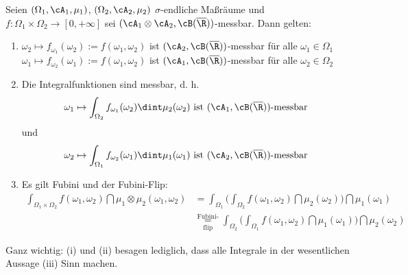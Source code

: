 \marginpar{\textcolor{red}{Vorlesung 19}}

\begin{satz}
	Seien $(\Omega_1, \cA_1, \mu_1)$, $(\Omega_2, \cA_2, \mu_2)$ $\sigma$-endliche Maßräume und $f\colon \Omega_1 \times \Omega_2 \to [0,+\infty]$ sei $(\cA_1 \otimes \cA_2, \cB(\overline{\R}))$-messbar. Dann gelten:
	\begin{enumerate}[label=(\roman*)]
		\item \label{FubOne} $\omega_2\mapsto f_{\omega_1}(\omega_2) := f(\omega_1, \omega_2)$ ist $(\cA_2, \cB(\overline{\R}))$-messbar f\"ur alle $\omega_1\in \Omega_1$ \newline $\omega_1\mapsto f_{\omega_2}(\omega_1) := f(\omega_1, \omega_2)$ ist $(\cA_1, \cB(\overline{\R}))$-messbar f\"ur alle $\omega_2\in \Omega_2$
		\item Die Integralfunktionen sind messbar, d. h.
		 \begin{align*}
		 	\omega_1 \mapsto \int_{\Omega_2} f_{\omega_1}(\omega_2) \dint \mu_2(\omega_2) \text{ ist } (\cA_1, \cB(\overline{\R}))\text{-messbar}
		\end{align*}
		 und 
		 \begin{align*}
		 	\omega_2 \mapsto \int_{\Omega_1} f_{\omega_2}(\omega_1) \dint \mu_1(\omega_1) \text{ ist } (\cA_2, \cB(\overline{\R}))\text{-messbar}
		\end{align*}
		\item Es gilt Fubini und der Fubini-Flip:
		\begin{align*}
			\int_{\Omega_1 \times \Omega_2} f(\omega_1,\omega_2) \dint \mu_1 \otimes \mu_2(\omega_1,\omega_2)
			&= \int_{\Omega_1}\Big( \int_{\Omega_2} f(\omega_1,\omega_2) \dint \mu_2(\omega_2) \Big) \dint \mu_1(\omega_1) \\
			&\underset{\text{flip}}{\overset{\text{Fubini-}}{=}} \int_{\Omega_2}\Big( \int_{\Omega_1} f(\omega_1,\omega_2) \dint \mu_1(\omega_1) \Big) \dint \mu_2(\omega_2) 
		\end{align*}
	\end{enumerate}
	Ganz wichtig: (i) und (ii) besagen lediglich, dass alle Integrale in der wesentlichen Aussage (iii) Sinn machen.
\end{satz}

